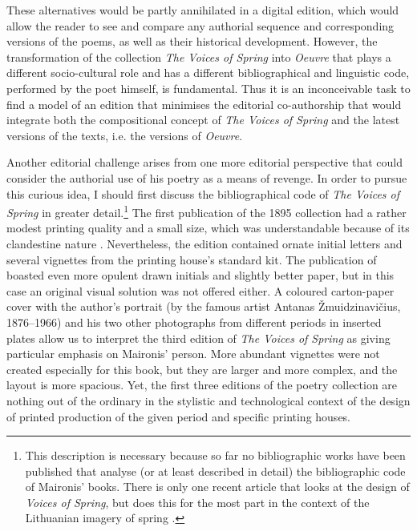 \begin{paper}
\noindent These alternatives would be partly annihilated in a digital edition,
which would allow the reader to see and compare any authorial sequence
and corresponding versions of the poems, as well as their historical
development. However, the transformation of the collection
\emph{The Voices of Spring} into \emph{Oeuvre} that plays a different
socio-cultural role and has a different bibliographical and linguistic
code, performed by the poet himself, is fundamental. Thus it is an
inconceivable task to find a model of an edition that minimises the
editorial co-authorship that would integrate both the compositional
concept of \emph{The Voices of Spring} and the latest versions of the
texts, i.e. the versions of \emph{Oeuvre}.

Another editorial challenge arises from one more editorial perspective that could consider the
authorial use of his poetry as a means of revenge. In order to pursue
this curious idea, I should first discuss the bibliographical code of
\emph{The Voices of Spring} in greater detail.\footnote{This description is necessary because so far no bibliographic
  works have been published that analyse (or at least described in detail)
  the bibliographic code of Maironis' books. There is only one recent article that
  looks at the design of \emph{Voices of Spring}, but does this for the most part in the
  context of the Lithuanian imagery of spring \citep{jankeviciute_maironis_2019}.} The
first publication of the 1895 collection had a rather modest printing
quality and a small size, which was understandable because of its
clandestine nature \citep{maironis_pavasario_1895}. Nevertheless, the edition contained ornate initial letters and
several vignettes from the printing house's standard kit. The
publication of \citeyear{maironis_pavasario_1905} boasted even more opulent drawn initials and
slightly better paper, but in this case an original visual solution was
not offered either. A coloured carton-paper cover with the author's
portrait (by the famous artist Antanas Žmuidzinavičius, 1876--1966) and
his two other photographs from different periods in inserted plates
allow us to interpret the third edition of \emph{The Voices of Spring}
as giving particular emphasis on Maironis' person. More abundant
vignettes were not created especially for this book, but they are larger
and more complex, and the layout is more spacious. Yet, the first three
editions of the poetry collection are nothing out of the ordinary in the
stylistic and technological context of the design of printed production
of the given period and specific printing houses.


\end{paper}
